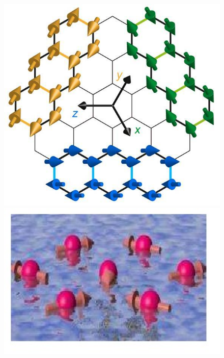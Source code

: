 \begin{frame}
    \titlepage %

%
\begin{figure}
    \begin{minipage}[c]{.25\textwidth}
        \includegraphics[width = 1\textwidth]{figures/Kim_manuscript_merged_F1.jpg} 
    \end{minipage}
    \hspace{2cm}
    \begin{minipage}[c]{.25\textwidth}
        \includegraphics[width = 1\textwidth]{figures/quantummapma.jpg}
    \end{minipage}
\end{figure}
 
\end{frame}

